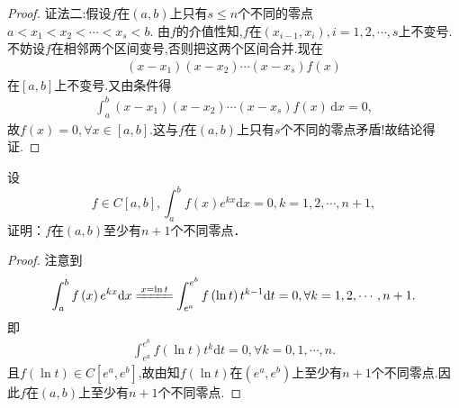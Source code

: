\documentclass[../../main.tex]{subfiles}%
\begin{document}
\begin{proof}
{\color{blue}证法二:}假设$f$在$\left( a,b \right)$上只有$s\leqslant n$个不同的零点
$a<x_1<x_2<\cdots <x_s<b.$
由$f$的介值性知,$f$在$\left( x_{i-1},x_i \right) ,i=1,2,\cdots ,s$上不变号.
不妨设$f$在相邻两个区间变号,否则把这两个区间合并.现在
\begin{align*}
\left( x-x_1 \right) \left( x-x_2 \right) \cdots \left( x-x_s \right) f\left( x \right)
\end{align*}
在$\left[ a,b \right]$上不变号.又由条件得
\begin{align*}
\int_a^b{\left( x-x_1 \right) \left( x-x_2 \right) \cdots \left( x-x_s \right) f\left( x \right)\,\mathrm{d}x}=0,
\end{align*}
故$f\left( x \right) =0,\forall x\in \left[ a,b \right]$.这与$f$在$\left( a,b \right)$上只有$s$个不同的零点矛盾!故结论得证.
\end{proof}

\begin{example}
设
\[
f \in C[a,b], \int_a^b f(x)e^{kx}\mathrm{d}x = 0, k = 1,2,\cdots,n + 1,
\]
证明：$f$在$(a,b)$至少有$n + 1$个不同零点．
\end{example}
\begin{proof}
注意到
\begin{align*}
\int_a^b{f\left( x \right) e^{kx}\mathrm{d}x}\xlongequal{x=\ln t}\int_{e^a}^{e^b}{f\left( \ln t \right) t^{k-1}\mathrm{d}t}=0,\forall k=1,2,\cdots ,n+1.
\end{align*}
即
\begin{align*}
\int_{e^a}^{e^b}{f\left( \ln t \right) t^k\mathrm{d}t}=0,\forall k=0,1,\cdots ,n.
\end{align*}
且$f\left( \ln t \right) \in C\left[ e^a,e^b \right]$,故由知$f\left( \ln t \right)$在$\left( e^a,e^b \right)$上至少有$n+1$个不同零点.因此$f$在$\left( a,b \right)$上至少有$n+1$个不同零点.
\end{proof}
\end{document}
